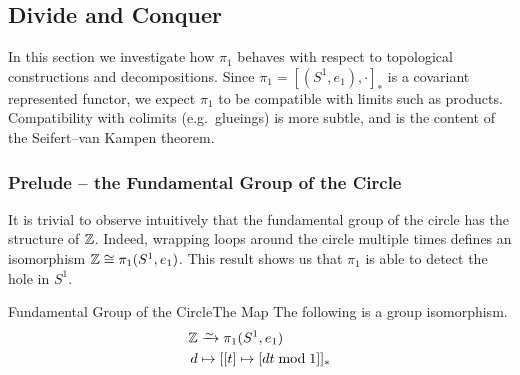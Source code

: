 \subsection{Divide and Conquer}

In this section we investigate how $\pi_1$ behaves with respect to topological constructions and decompositions. Since $\pi_1=[(S^1,e_1),\cdot]_*$ is a covariant represented functor, we expect $\pi_1$ to be compatible with limits such as products. Compatibility with colimits (e.g.\ glueings) is more subtle, and is the content of the Seifert--van Kampen theorem.


\subsubsection{Prelude -- the Fundamental Group of the Circle}
It is trivial to observe intuitively that the fundamental group of the circle has the structure of $\mathbb{Z}$. Indeed, wrapping loops around the circle multiple times defines an isomorphism $\mathbb{Z}\cong \pi_1(S^1,e_1)$. This result shows us that $\pi_1$ is able to detect the hole in $S^1$.

\begin{theorem}{Fundamental Group of the Circle}{The Map}
  The following is a group isomorphism. \begin{align*}
    \Z &\isoto \pi_1(S^1,e_1) \\
    d &\mapsto [[t] \mapsto [dt \bmod 1]]_*
  \end{align*}
\end{theorem}

